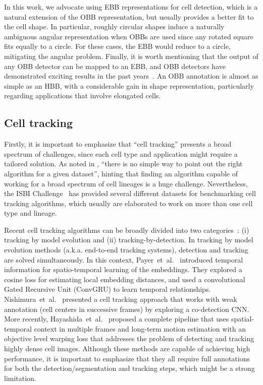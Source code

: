 \documentclass{article}
\begin{document}
In this work, we advocate using EBB representations for cell detection, which is a natural extension of the OBB representation, but usually provides a better fit to the cell shape. In particular, roughly circular shapes induce a naturally ambiguous angular representation when OBBs are used since any rotated square fits equally to a circle. For these cases, the EBB would reduce to a circle, mitigating the angular problem. Finally, it is worth mentioning that the output of any OBB detector can be mapped to an EBB, and OBB detectors have demonstrated exciting results in the past years~\cite{r2cnn,yang2021r3det,dota,kld}. An OBB annotation is almost as simple as an HBB, with a considerable gain in shape representation, particularly regarding applications that involve elongated cells. 


\subsection{Cell tracking}

Firstly, it is important to emphasize that ``cell tracking'' presents a broad spectrum of challenges, since each cell type and application might require a tailored solution. As noted in \cite{ulman2017objective}, ``there is no simple way to point out the right algorithm for a given dataset'', hinting that finding an algorithm capable of working for a broad spectrum of cell lineages is a huge challenge. Nevertheless, the ISBI Challenge~\cite{isbi} has provided several different datasets for benchmarking cell tracking algorithms, which usually are elaborated to work on more than one cell type and lineage. 

Recent cell tracking algorithms can be broadly divided into two categories~\cite{epflheid,blob,drl}: (i) tracking by model evolution and (ii) tracking-by-detection. In tracking by model evolution methods (a.k.a. end-to-end tracking systems), detection and tracking  are solved simultaneously. In this context, Payer~et~al.~\cite{payer2018instance,payer2019segmenting} introduced temporal information for spatio-temporal learning of the embeddings. They explored a cosine loss for estimating local embedding distances, and used a convolutional Gated Recursive Unit (ConvGRU) to learn temporal relationships. Nishimura~et~al.~\cite{nishimura2020weakly} presented a cell tracking approach that works with weak annotation (cell centers in successive frames) by exploring a co-detection CNN. More recently, Hayashida~et~al.~\cite{hayashida2022consistent} proposed a complete pipeline that uses spatial-temporal context in multiple frames and long-term motion estimation with an objective level warping loss that addresses the problem of detecting and tracking highly dense cell images. Although these methods are capable of achieving high performance, it is important to emphasize that they all require full annotations for both the detection/segmentation and tracking steps, which might be a strong limitation.
\end{document}
